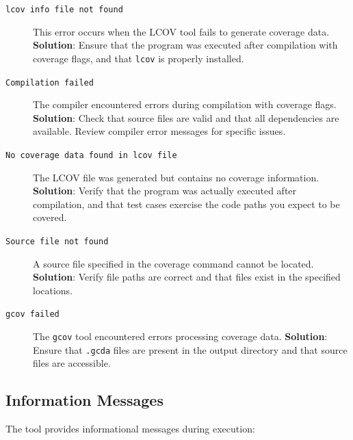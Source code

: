 \begin{description}
    \item[\texttt{lcov info file not found}] This error occurs when the LCOV tool fails to generate coverage data. \textbf{Solution}: Ensure that the program was executed after compilation with coverage flags, and that \texttt{lcov} is properly installed.
    
    \item[\texttt{Compilation failed}] The compiler encountered errors during compilation with coverage flags. \textbf{Solution}: Check that source files are valid and that all dependencies are available. Review compiler error messages for specific issues.
    
    \item[\texttt{No coverage data found in lcov file}] The LCOV file was generated but contains no coverage information. \textbf{Solution}: Verify that the program was actually executed after compilation, and that test cases exercise the code paths you expect to be covered.
    
    \item[\texttt{Source file not found}] A source file specified in the coverage command cannot be located. \textbf{Solution}: Verify file paths are correct and that files exist in the specified locations.
    
    \item[\texttt{gcov failed}] The \texttt{gcov} tool encountered errors processing coverage data. \textbf{Solution}: Ensure that \texttt{.gcda} files are present in the output directory and that source files are accessible.
\end{description}

\subsection{Information Messages}

The tool provides informational messages during execution:

